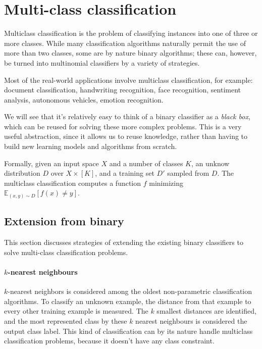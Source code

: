 \chapter{Multi-class classification}

Multiclass classification is the problem of classifying instances into one of three or more classes. While many classification algorithms naturally permit the use of more than two classes, some are by nature binary algorithms; these can, however, be turned into multinomial classifiers by a variety of strategies.

Most of the real-world applications involve multiclass classification, for example: document classification, handwriting recognition, face recognition, sentiment analysis, autonomous vehicles, emotion recognition.

We will see that it's relatively easy to think of a binary classifier as a \emph{black box}, which can be reused for solving these more complex problems. This is a very useful abstraction, since it allows us to reuse knowledge, rather than having to build new learning models and algorithms from scratch.

Formally, given an input space \(X\) and a number of classes \(K\), an unknow distribution \(D\) over \(X \times [K]\), and a training set \(D'\) sampled from \(D\). The multiclass classification computes a function \(f\) minimizing \(\mathbb{E}_{(x,y)\sim D} [f(x) \neq y]\).

\section{Extension from binary}

This section discusses strategies of extending the existing binary classifiers to solve multi-class classification problems.

\subsubsection{\(k\)-nearest neighbours}
\(k\)-nearest neighbors is considered among the oldest non-parametric classification algorithms. To classify an unknown example, the distance from that example to every other training example is measured. The \(k\) smallest distances are identified, and the most represented class by these \(k\) nearest neighbours is considered the output class label. This kind of classification can by its nature handle multiclass classification problems, because it doesn't have any class constraint. 

